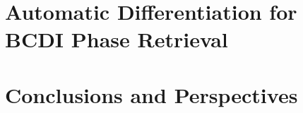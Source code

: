 \documentclass[12pt]{book}
\begin{document}
\chapter{Automatic Differentiation for BCDI Phase Retrieval}
\label{chap:AD_phase_retrieval}


\chapter{Conclusions and Perspectives}
\label{chap:conclusions}


% 


% 
\printbibliography
{}


% 
\end{document}
